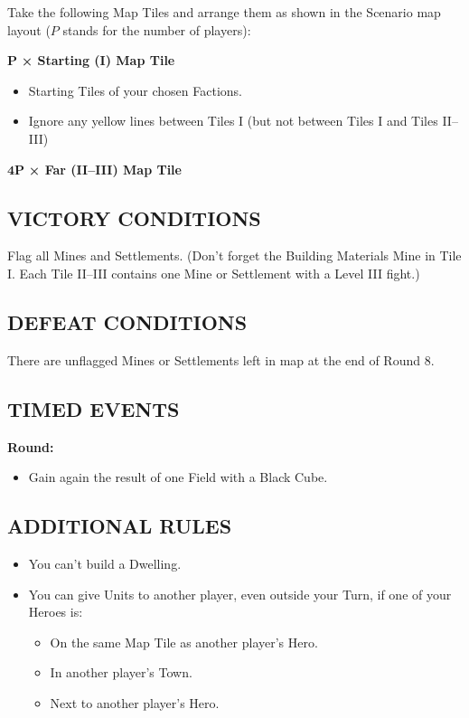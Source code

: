 \begin{multicols*}{2}
Take the following Map Tiles and arrange them as shown in the Scenario map layout ($P$ stands for the number of players):

$\boldsymbol{P}$ \textbf{× Starting (I) Map Tile}
\begin{itemize}
  \item Starting Tiles of your chosen Factions.
  \item Ignore any yellow lines between Tiles I (but not between Tiles I and Tiles II--III)
\end{itemize}

$\boldsymbol{4 P}$ \textbf{× Far (II--III) Map Tile}

\subsection*{\MakeUppercase{Victory Conditions}}

Flag all Mines and Settlements. (Don't forget the Building Materials Mine in Tile I. Each Tile II--III contains one Mine or Settlement with a Level III fight.)

\subsection*{\MakeUppercase{Defeat Conditions}}

There are unflagged Mines or Settlements left in map at the end of Round 8.

\subsection*{\MakeUppercase{Timed Events}}

\textbf{ Round:}
\begin{itemize}
  \item Gain again the result of one Field with a Black Cube.
\end{itemize}

\subsection*{\MakeUppercase{Additional Rules}}

\begin{itemize}
    \item You can't build a  Dwelling.

    \item You can give Units to another player, even outside your Turn, if one of your Heroes is:
    \begin{itemize}
        \item On the same Map Tile as another player's Hero.
        \item In another player's Town.
        \item Next to another player's Hero.
    \end{itemize}


\end{itemize}
\end{multicols*}
